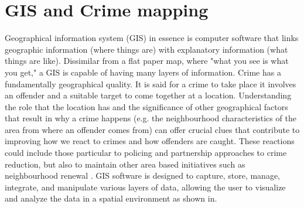 \section{GIS and Crime mapping}
Geographical information system (GIS) in essence is computer software that links geographic information (where things are) with explanatory information (what things are like). Dissimilar from a flat paper map, where "what you see is what you get," a GIS is capable of having many layers of information.
Crime has a fundamentally geographical quality. It is said for a crime to take place it involves an offender and a suitable target to come together at a location. Understanding the role that the location has and the significance of other geographical factors that result in why a crime happens (e.g. the neighbourhood characteristics of the area from where an offender comes from) can offer crucial clues that contribute to improving how we react to crimes and how offenders are caught. These reactions could include those particular to policing and partnership approaches to crime reduction, but also to maintain other area based initiatives such as neighbourhood renewal \cite{28}.
GIS software is designed to capture, store, manage, integrate, and manipulate various layers of data, allowing the user to visualize and analyze the data in a spatial environment as shown in. 





